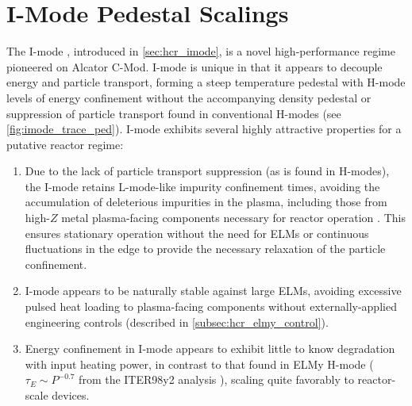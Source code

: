 \chapter{I-Mode Pedestal Scalings}\label{ch:ImodePedestal}

The I-mode \cite{Whyte2010,Hubbard2011}, introduced in \cref{sec:hcr_imode}, is a novel high-performance regime pioneered on Alcator C-Mod.  I-mode is unique in that it appears to decouple energy and particle transport, forming a steep temperature pedestal with H-mode levels of energy confinement without the accompanying density pedestal or suppression of particle transport found in conventional H-modes (see \cref{fig:imode_trace_ped}).  I-mode exhibits several highly attractive properties for a putative reactor regime:

\begin{enumerate}
 \item Due to the lack of particle transport suppression (as is found in H-modes), the I-mode retains L-mode-like impurity confinement times, avoiding the accumulation of deleterious impurities in the plasma, including those from high-$Z$ metal plasma-facing components necessary for reactor operation \cite{Loarte2007}.  This ensures stationary operation without the need for ELMs or continuous fluctuations in the edge to provide the necessary relaxation of the particle confinement.
 \item I-mode appears to be naturally stable against large ELMs, avoiding excessive pulsed heat loading to plasma-facing components without externally-applied engineering controls (described in \cref{subsec:hcr_elmy_control}).
 \item Energy confinement in I-mode appears to exhibit little to know degradation with input heating power, in contrast to that found in ELMy H-mode ($\tau_E \sim P^{-0.7}$ from the ITER98y2 analysis \cite{ITER1999}), scaling quite favorably to reactor-scale devices.
\end{enumerate}


